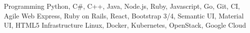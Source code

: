 \begin{cvskills}
  \cvskill
    {Programming}
    {Python, C\#, C++, Java, Node.js, Ruby, Javascript, Go, Git, CI, Agile}
  \cvskill
    {Web}
    {Express, Ruby on Rails, React, Bootstrap 3/4, Semantic UI, Material UI, HTML5}
  \cvskill
    {Infrastructure}
    {Linux, Docker, Kubernetes, OpenStack, Google Cloud}
\end{cvskills}
